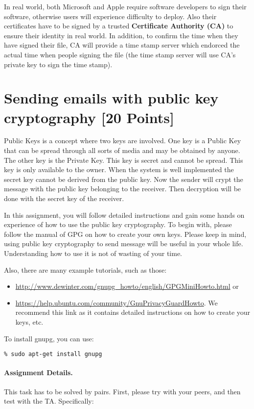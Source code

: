 \documentclass[11pt]{article}
\begin{document}
In real world, both Microsoft and Apple require software developers to sign their software, otherwise users will experience difficulty to deploy. Also their certificates have to be signed by a trusted \textbf{Certificate Authority (CA)} to ensure their identity in real world. In addition, to confirm the time when they have signed their file, CA will provide a time stamp server which endorced the actual time when people signing the file (the time stamp server will use CA's private key to sign the time stamp).

\medskip

\section{Sending emails with public key cryptography [20 Points]}

Public Keys is a concept where two keys are involved. One key is a Public Key that can be spread through all sorts of media and may be obtained by anyone. The other key is the Private Key. This key is secret and cannot be spread. This key is only available to the owner. When the system is well implemented the secret key cannot be derived from the public key. Now the sender will crypt the message with the public key belonging to the receiver. Then decryption will be done with the secret key of the receiver.

In this assignment, you will follow detailed instructions and gain some hands on experience of how to use the public key cryptography. To begin with, please follow the manual of GPG on how to create your own keys. Please keep in mind, using public key cryptography to send message will be useful in your whole life. Understanding how to use it is not of wasting of your time.

Also, there are many example tutorials, such as those:
\begin{itemize}
\item \url{http://www.dewinter.com/gnupg_howto/english/GPGMiniHowto.html} or
\item \url{https://help.ubuntu.com/community/GnuPrivacyGuardHowto}. We recommend this link as it contains detailed instructions on how to create your keys, etc.
\end{itemize}

To install gnupg, you can use:
\begin{lstlisting}
% sudo apt-get install gnupg
\end{lstlisting}

\paragraph{Assignment Details.} This task has to be solved by pairs. First, please try with your peers, and then test with the TA. Specifically:
\end{document}
